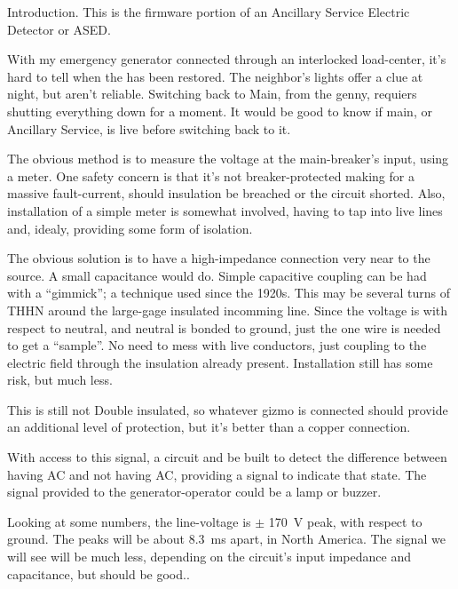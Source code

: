 


\nocon %
\datethis %


Introduction. This is the firmware portion of an Ancillary Service
Electric Detector or ASED.

With my  emergency generator connected through an interlocked load-center, it's
hard to tell when the  has been restored.
The neighbor's lights offer a clue at night, but aren't reliable.
Switching back to Main, from the genny, requiers shutting  everything down for
a moment.
It would be good to know if main, or Ancillary Service, is live before
switching back to it.

The obvious method is to measure the voltage at the main-breaker's input, using
a meter.
One safety concern is that it's not breaker-protected making for a massive
fault-current, should insulation be breached or the circuit shorted.
Also, installation of a simple meter is somewhat involved, having to tap into
live lines and, idealy, providing some form of isolation.

The obvious solution is to have a high-impedance connection very near to the
source.
A small capacitance would do.
Simple capacitive coupling can be had with a ``gimmick''; a technique used
since the 1920s.
This may be several turns of THHN around the large-gage insulated incomming
line.
Since the voltage is with respect to neutral, and neutral is bonded to ground,
just the one wire is needed to get a ``sample''.
No need to mess with live conductors, just coupling to the electric field
through the insulation already present.
Installation still has some risk, but much less.

This is still not Double insulated, so whatever gizmo is connected should
provide an additional level of protection, but it's better than a copper
connection.

With access to this signal, a circuit and be built to detect the difference
between having AC and not having AC,  providing a signal to indicate that
state.
The signal provided to the generator-operator could be a lamp or buzzer.

Looking at some numbers, the line-voltage is $\pm$ 170~V peak, with respect to
ground.
The peaks will be about 8.3~ms apart, in North America.
The signal we  will see will be much less, depending on the circuit's input
impedance and capacitance, but should be good..

